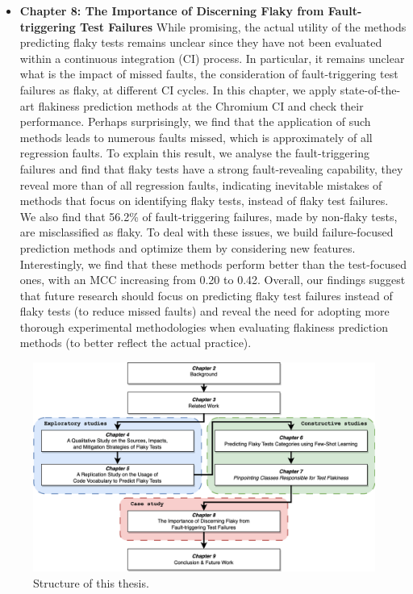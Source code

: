 \begin{itemize}
    \item \textbf{Chapter 8: The Importance of Discerning Flaky from Fault-triggering Test Failures} While promising, the actual utility of the methods predicting flaky tests remains unclear since they have not been evaluated within a continuous integration (CI) process. In particular, it remains unclear what is the impact of missed faults, \ie the consideration of fault-triggering test failures as flaky, at different CI cycles. In this chapter, we apply state-of-the-art flakiness prediction methods at the Chromium CI and check their performance. Perhaps surprisingly, we find that the application of such methods leads to numerous faults missed, which is approximately  of all regression faults. To explain this result, we analyse the fault-triggering failures and find that flaky tests have a strong fault-revealing capability, \ie they reveal more than  of all regression faults, indicating inevitable mistakes of methods that focus on identifying flaky tests, instead of flaky test failures. We also find that 56.2\% of fault-triggering failures, made by non-flaky tests, are misclassified as flaky. To deal with these issues, we build failure-focused prediction methods and optimize them by considering new features. Interestingly, we find that these methods perform better than the test-focused ones, with an MCC increasing from 0.20 to 0.42. Overall, our findings suggest that future research should focus on predicting flaky test failures instead of flaky tests (to reduce missed faults) and reveal the need for adopting more thorough experimental methodologies when evaluating flakiness prediction methods (to better reflect the actual practice).
\end{itemize}

\begin{figure}[ht]
\centering
\includegraphics[width=1\textwidth]{figures/core/structure.png}
\caption{Structure of this thesis.}
\label{fig:structure}
\end{figure}

